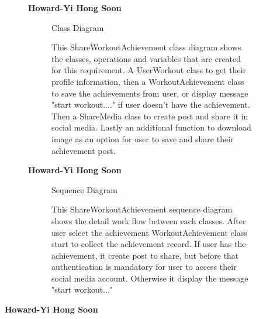 \documentclass{article}
\begin{document}
	\begin{figure}[htbp]
		\textbf{Howard-Yi Hong Soon}
		\centering
		\begin{subfigure}{\textwidth}
			\resizebox{\textwidth}{!}{}
			\caption{Class Diagram}
		\end{subfigure}
		\begin{subfigure}{\textwidth}
			This ShareWorkoutAchievement class diagram shows the classes, operations and variables that are created
			for this requirement. A UserWorkout class to get their profile information, then a WorkoutAchievement class to save 
			the achievements from user, or display message "start workout...." if user doesn't have the achievement. 
			Then a ShareMedia class to create post and share it in social media. Lastly an additional function to download image
			as an option for user to save and share their achievement post.
		\end{subfigure}
	\end{figure}
	

	
	\begin{figure}[htbp]
		\textbf{Howard-Yi Hong Soon}
		\centering
		\begin{subfigure}{\textwidth}
			\resizebox{\textwidth}{!}{}
			\caption{Sequence Diagram}
		\end{subfigure}
		\begin{subfigure}{\textwidth}
			This ShareWorkoutAchievement sequence diagram shows the detail work flow between each classes. After user select the achievement
			WorkoutAchievement class start to collect the achievement record. If user has the achievement, it create post to share, but before that authentication is 
			mandatory for user to access their social media account. Otherwise it display the message "start workout..."
		\end{subfigure}
	\end{figure}
	\newpage

		\textbf{Howard-Yi Hong Soon}
\end{document}
